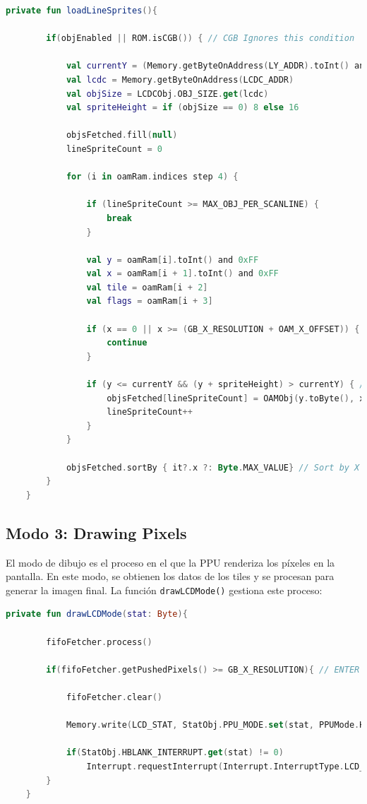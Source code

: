 \begin{lstlisting}[language=Kotlin, caption={Obtención de sprites en modo OAM Scan.}, label={code:ppuoamscansprites}]
    private fun loadLineSprites(){

        if(objEnabled || ROM.isCGB()) { // CGB Ignores this condition

            val currentY = (Memory.getByteOnAddress(LY_ADDR).toInt() and 0xFF) + OAM_Y_OFFSET
            val lcdc = Memory.getByteOnAddress(LCDC_ADDR)
            val objSize = LCDCObj.OBJ_SIZE.get(lcdc)
            val spriteHeight = if (objSize == 0) 8 else 16

            objsFetched.fill(null)
            lineSpriteCount = 0

            for (i in oamRam.indices step 4) {

                if (lineSpriteCount >= MAX_OBJ_PER_SCANLINE) {
                    break
                }

                val y = oamRam[i].toInt() and 0xFF
                val x = oamRam[i + 1].toInt() and 0xFF
                val tile = oamRam[i + 2]
                val flags = oamRam[i + 3]

                if (x == 0 || x >= (GB_X_RESOLUTION + OAM_X_OFFSET)) { // Sprite not visible
                    continue
                }

                if (y <= currentY && (y + spriteHeight) > currentY) { // Sprite on current line
                    objsFetched[lineSpriteCount] = OAMObj(y.toByte(), x.toByte(), tile, flags)
                    lineSpriteCount++
                }
            }

            objsFetched.sortBy { it?.x ?: Byte.MAX_VALUE} // Sort by X position
        }
    }
\end{lstlisting}

\subsection{Modo 3: Drawing Pixels}

El modo de dibujo es el proceso en el que la PPU renderiza los píxeles en la pantalla. En este modo, se obtienen los datos de los tiles y se procesan para generar la imagen final. La función \texttt{drawLCDMode()} gestiona este proceso:

\begin{lstlisting}[language=Kotlin, caption={Dibujado de píxeles en Modo 3.}, label={code:ppuoamdrawpixels}]
    private fun drawLCDMode(stat: Byte){

        fifoFetcher.process()

        if(fifoFetcher.getPushedPixels() >= GB_X_RESOLUTION){ // ENTER HBLANK MODE

            fifoFetcher.clear()

            Memory.write(LCD_STAT, StatObj.PPU_MODE.set(stat, PPUMode.HBlank.number))

            if(StatObj.HBLANK_INTERRUPT.get(stat) != 0)
                Interrupt.requestInterrupt(Interrupt.InterruptType.LCD_STAT.getByteMask()) // ASK FOR LCD STAT INTERRUPT IF LCD_STAT HAS THE HBLANK BIT ACTIVATED
        }
    }
\end{lstlisting}

